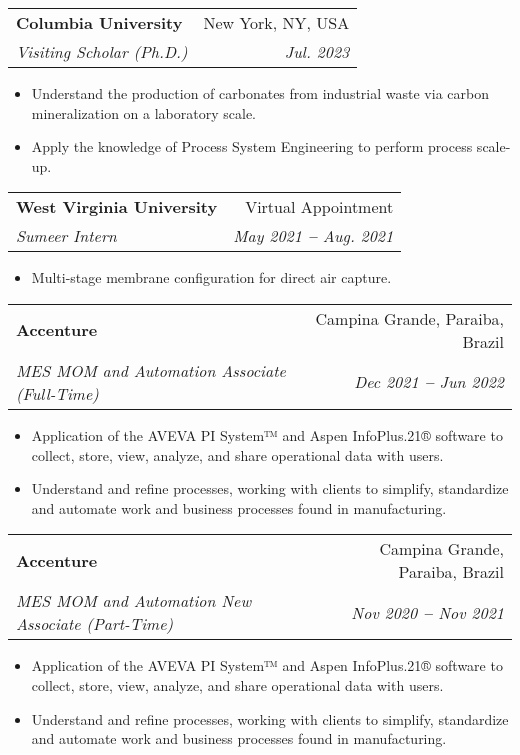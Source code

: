 \documentclass[letterpaper,11pt]{article}
\makeatletter
\newcommand{\resumeItem}[1]{
  \item\small{
    {#1 \vspace{-2pt}}
  }
}
\newcommand{\resumeSubheading}[4]{
  \vspace{-2pt}\item
    \begin{tabular*}{0.97\textwidth}[t]{l@{\extracolsep{\fill}}r}
      \textbf{#1} & #2 \\
      \textit{\small#3} & \textit{\small #4} \\
    \end{tabular*}\vspace{-7pt}
}
\newcommand{\resumeItemListStart}{\begin{itemize}}
\newcommand{\resumeItemListEnd}{\end{itemize}\vspace{-5pt}}
\makeatother
\begin{document}
    \resumeSubheading
      {Columbia University}{New York, NY, USA}
      {Visiting Scholar (Ph.D.)}{Jul. 2023 }
        \resumeItemListStart
            \resumeItem{Understand the production of carbonates from industrial waste via carbon mineralization on a laboratory scale.}
            \resumeItem{Apply the knowledge of Process System Engineering to perform process scale-up.}
        \resumeItemListEnd




    
   \resumeSubheading
      {West Virginia University}{Virtual Appointment}
      {Sumeer Intern}{May 2021 \textbf{--} Aug. 2021}
        \resumeItemListStart
            \resumeItem{Multi-stage membrane configuration for direct air capture.}
        \resumeItemListEnd    

    \resumeSubheading
      {Accenture}{Campina Grande, Paraiba, Brazil}
      {MES MOM and Automation Associate (Full-Time)}{Dec 2021 \textbf{--} Jun 2022}
        \resumeItemListStart
            \resumeItem{Application of the AVEVA PI System™ and Aspen InfoPlus.21® software to collect, store, view, analyze, and share operational data with users.}
            \resumeItem{Understand and refine processes, working with clients to simplify, standardize and automate work and business processes found in manufacturing.}
          \resumeItemListEnd


    \resumeSubheading
    {Accenture}{Campina Grande, Paraiba, Brazil}
    {MES MOM and Automation New Associate (Part-Time)}{Nov 2020 \textbf{--} Nov 2021}
      \resumeItemListStart
          \resumeItem{Application of the AVEVA PI System™ and Aspen InfoPlus.21® software to collect, store, view, analyze, and share operational data with users.}
          \resumeItem{Understand and refine processes, working with clients to simplify, standardize and automate work and business processes found in manufacturing.}
        \resumeItemListEnd
\end{document}
